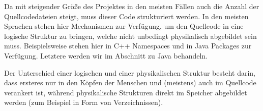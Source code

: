 	Da mit steigender Größe des Projektes in den meisten Fällen auch die Anzahl der Quellcodedateien steigt, muss dieser Code strukturiert werden. In den meisten Sprachen stehen hier Mechanismen zur Verfügung, um den Quellcode in eine logische Struktur zu bringen, welche nicht unbedingt physikalisch abgebildet sein muss. Beispielsweise stehen hier in C++ Namespaces und in Java Packages zur Verfügung. Letztere werden wir im Abschnitt zu Java behandeln.
	
	Der Unterschied einer logischen und einer physikalischen Struktur besteht darin, dass ersteres nur in den Köpfen der Menschen und (meistens) auch im Quellcode verankert ist, während physikalische Strukturen direkt im Speicher abgebildet werden (zum Beispiel in Form von Verzeichnissen).
